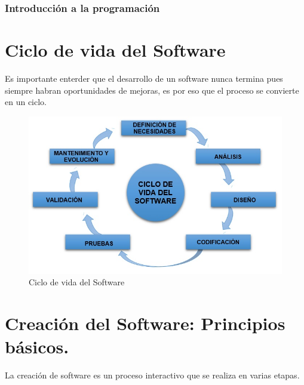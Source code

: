 \documentclass[a4paper,12pt,spanish]{article}
\begin{document}
\newpage
\restoregeometry

\subsubsection{Introducción a la programación}
\label{sec:intr-la-progr}

\section{Ciclo de vida del Software}
\label{sec:ciclovida}

Es importante enterder que el desarrollo de un software nunca termina pues siempre habran oportunidades de mejoras, es por eso que el proceso se convierte en un ciclo.

\begin{figure}[H]
  \centering
  \includegraphics[scale=0.5]{ciclo}
  \caption{Ciclo de vida del Software}
  \label{fig:documentacion}
\end{figure}


\section{Creación del Software: Principios básicos.}
\label{sec:creac-del-softw}

La creación de software es un proceso interactivo que se realiza en
varias etapas.\\
\end{document}
